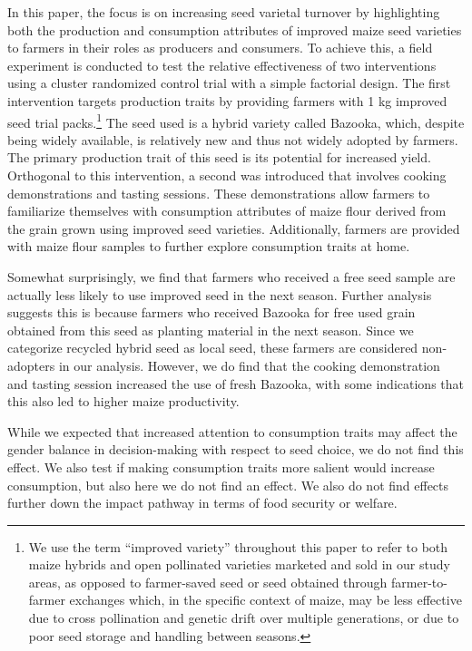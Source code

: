 \documentclass[english]{article}\usepackage[]{graphicx}\usepackage[]{xcolor}
\begin{document}
In this paper, the focus is on increasing seed varietal turnover by
highlighting both the production and consumption attributes of improved
maize seed varieties to farmers in their roles as producers and consumers.
To achieve this, a field experiment is conducted to test the relative
effectiveness of two interventions using a cluster randomized control
trial with a simple factorial design. The first intervention targets
production traits by providing farmers with 1 kg improved seed trial
packs.\footnote{We use the term ``improved variety'' throughout this paper to refer
to both maize hybrids and open pollinated varieties marketed and sold
in our study areas, as opposed to farmer-saved seed or seed obtained
through farmer-to-farmer exchanges which, in the specific context
of maize, may be less effective due to cross pollination and genetic
drift over multiple generations, or due to poor seed storage and handling
between seasons.} The seed used is a hybrid variety called Bazooka, which, despite
being widely available, is relatively new and thus not widely adopted
by farmers. The primary production trait of this seed is its potential
for increased yield. Orthogonal to this intervention, a second was
introduced that involves cooking demonstrations and tasting sessions.
These demonstrations allow farmers to familiarize themselves with
consumption attributes of maize flour derived from the grain grown
using improved seed varieties. Additionally, farmers are provided
with maize flour samples to further explore consumption traits at
home. 

Somewhat surprisingly, we find that farmers who received a free seed
sample are actually less likely to use improved seed in the next season.
Further analysis suggests this is because farmers who received Bazooka
for free used grain obtained from this seed as planting material in
the next season. Since we categorize recycled hybrid seed as local
seed, these farmers are considered non-adopters in our analysis. However,
we do find that the cooking demonstration and tasting session increased
the use of fresh Bazooka, with some indications that this also led
to higher maize productivity.

While we expected that increased attention to consumption traits may
affect the gender balance in decision-making with respect to seed
choice, we do not find this effect. We also test if making consumption
traits more salient would increase consumption, but also here we do
not find an effect. We also do not find effects further down the impact
pathway in terms of food security or welfare.
\end{document}
